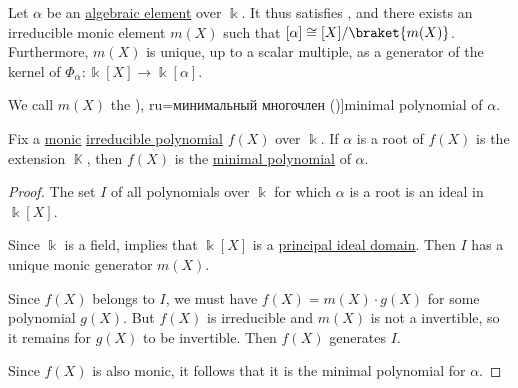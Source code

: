 \begin{definition}\label{def:algebraic_element_minimal_polynomial}
  Let \( \alpha \) be an \hyperref[def:algebraic_element]{algebraic element} over \( \Bbbk \). It thus satisfies , and there exists an irreducible monic element \( m(X) \) such that \( \Bbbk[\alpha] \cong \Bbbk[X] / \braket{ m(X) } \). Furthermore, \( m(X) \) is unique, up to a scalar multiple, as a generator of the kernel of \( \Phi_\alpha: \Bbbk[X] \to \Bbbk[\alpha] \).

  We call \( m(X) \) the \term[bg=минимален полином (\cite[def. VI.2]{ГеновМиховскиМоллов1991Алгебра}), ru=минимальный многочлен (\cite[410]{Винберг2014Алгебра})]{minimal polynomial} of \( \alpha \).
\end{definition}

\begin{proposition}\label{thm:irreducible_polynomial_is_minimal}
  Fix a \hyperref[def:monic_polynomial]{monic} \hyperref[def:domain_divisibility/irreducible]{irreducible polynomial} \( f(X) \) over \( \Bbbk \). If \( \alpha \) is a root of \( f(X) \) is the extension \( \BbbK \), then \( f(X) \) is the \hyperref[def:algebraic_element_minimal_polynomial]{minimal polynomial} of \( \alpha \).
\end{proposition}
\begin{proof}
  The set \( I \) of all polynomials over \( \Bbbk \) for which \( \alpha \) is a root is an ideal in \( \Bbbk[X] \).

  Since \( \Bbbk \) is a field,  implies that \( \Bbbk[X] \) is a \hyperref[def:principal_ideal_domain]{principal ideal domain}. Then \( I \) has a unique monic generator \( m(X) \).

  Since \( f(X) \) belongs to \( I \), we must have \( f(X) = m(X) \cdot g(X) \) for some polynomial \( g(X) \). But \( f(X) \) is irreducible and \( m(X) \) is not a invertible, so it remains for \( g(X) \) to be invertible. Then \( f(X) \) generates \( I \).

  Since \( f(X) \) is also monic, it follows that it is the minimal polynomial for \( \alpha \).
\end{proof}

